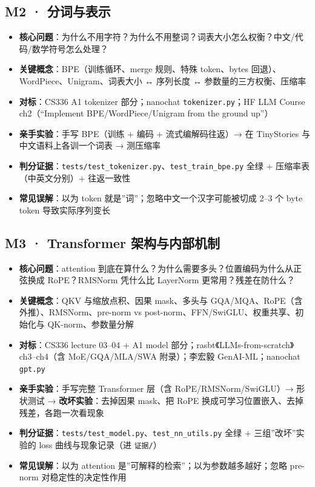 \documentclass[
  chinese,
  11pt,
]{ctexart}
\providecommand{\tightlist}{%
  \setlength{\itemsep}{0pt}\setlength{\parskip}{0pt}}
\begin{document}
\subsection{M2 · 分词与表示}\label{m2-ux5206ux8bcdux4e0eux8868ux793a}

\begin{itemize}
\tightlist
\item
  \textbf{核心问题}：为什么不用字符？为什么不用整词？词表大小怎么权衡？中文/代码/数学符号怎么处理？
\item
  \textbf{关键概念}：BPE（训练循环、merge 规则、特殊 token、bytes 回退）、WordPiece、Unigram、词表大小 ↔ 序列长度 ↔ 参数量的三方权衡、压缩率
\item
  \textbf{对标}：CS336 A1 tokenizer 部分；nanochat \texttt{tokenizer.py}；HF LLM Course ch2（``Implement BPE/WordPiece/Unigram from the ground up''）
\item
  \textbf{亲手实验}：手写 BPE（训练 + 编码 + 流式编解码往返）→ 在 TinyStories 与中文语料上各训一个词表 → 测压缩率
\item
  \textbf{判分证据}：\texttt{tests/test\_tokenizer.py}、\texttt{test\_train\_bpe.py} 全绿 + 压缩率表（中英文分别）+ 往返一致性
\item
  \textbf{常见误解}：以为 token 就是''词''；忽略中文一个汉字可能被切成 2--3 个 byte token 导致实际序列变长
\end{itemize}

\subsection{M3 · Transformer 架构与内部机制}\label{m3-transformer-ux67b6ux6784ux4e0eux5185ux90e8ux673aux5236}

\begin{itemize}
\tightlist
\item
  \textbf{核心问题}：attention 到底在算什么？为什么需要多头？位置编码为什么从正弦换成 RoPE？RMSNorm 凭什么比 LayerNorm 更常用？残差在防什么？
\item
  \textbf{关键概念}：QKV 与缩放点积、因果 mask、多头与 GQA/MQA、RoPE（含外推）、RMSNorm、pre-norm vs post-norm、FFN/SwiGLU、权重共享、初始化与 QK-norm、参数量分解
\item
  \textbf{对标}：CS336 lecture 03--04 + A1 model 部分；rasbt《LLMs-from-scratch》ch3--ch4（含 MoE/GQA/MLA/SWA 附录）；李宏毅 GenAI-ML；nanochat \texttt{gpt.py}
\item
  \textbf{亲手实验}：手写完整 Transformer 层（含 RoPE/RMSNorm/SwiGLU）→ 形状测试 → \textbf{改坏实验}：去掉因果 mask、把 RoPE 换成可学习位置嵌入、去掉残差，各跑一次看现象
\item
  \textbf{判分证据}：\texttt{tests/test\_model.py}、\texttt{test\_nn\_utils.py} 全绿 + 三组''改坏''实验的 loss 曲线与现象记录（进 \texttt{证据/}）
\item
  \textbf{常见误解}：以为 attention 是''可解释的检索''；以为参数越多越好；忽略 pre-norm 对稳定性的决定性作用
\end{itemize}
\end{document}

